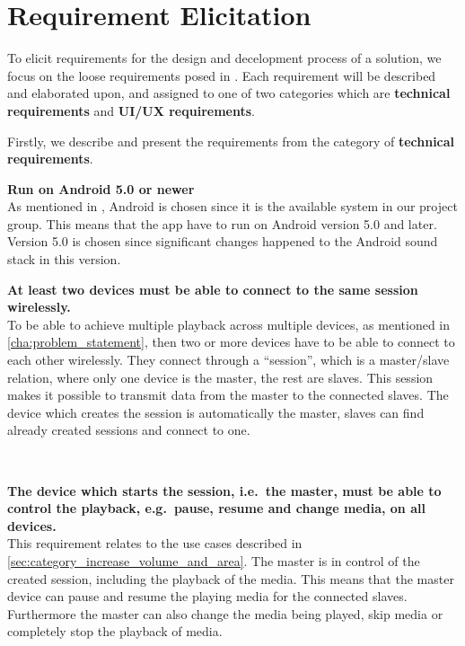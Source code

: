 \chapter{Requirement Elicitation}\label{cha:requirement_elicitation}
To elicit requirements for the design and decelopment process of a solution, we focus on the loose requirements posed in .
Each requirement will be described and elaborated upon, and assigned to one of two categories which are \textbf{technical requirements} and \textbf{UI/UX requirements}.

Firstly, we describe and present the requirements from the category of \textbf{technical requirements}.

\begin{eletterate}
    \item \textbf{Run on Android 5.0 or newer} \hfill\\
        As mentioned in , Android is chosen since it is the available system in our project group.
        This means that the app have to run on Android version 5.0 and later.
        Version 5.0 is chosen since significant changes happened to the Android sound stack in this version\cite{android_5_sound_stack}.

    \item \textbf{At least two devices must be able to connect to the same session wirelessly.} \hfill\\
        To be able to achieve multiple playback across multiple devices, as mentioned in \cref{cha:problem_statement},
        then two or more devices have to be able to connect to each other wirelessly.
        They connect through a ``session'', which is a master/slave relation, where only one device is the master, the rest are slaves.
        This session makes it possible to transmit data from the master to the connected slaves.
        The device which creates the session is automatically the master, slaves can find already created sessions and connect to one.

    \item \textbf{The device which starts the session, i.e.~the master, must be able to control the playback, e.g.~pause, resume and change media, on all devices.} \hfill\\
        This requirement relates to the use cases described in \cref{sec:category_increase_volume_and_area}.
        The master is in control of the created session, including the playback of the media.
        This means that the master device can pause and resume the playing media for the connected slaves.
        Furthermore the master can also change the media being played, skip media or completely stop the playback of media.


\end{eletterate}
